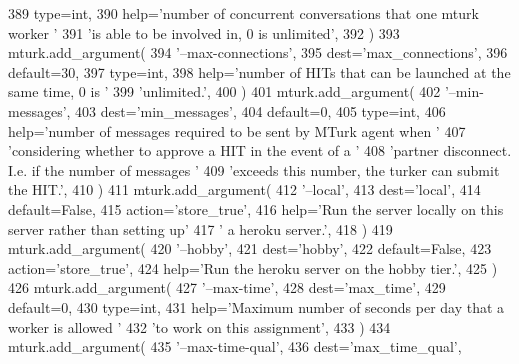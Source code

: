 \begin{DoxyCode}
389             type=int,
390             help=\textcolor{stringliteral}{'number of concurrent conversations that one mturk worker '}
391             \textcolor{stringliteral}{'is able to be involved in, 0 is unlimited'},
392         )
393         mturk.add\_argument(
394             \textcolor{stringliteral}{'--max-connections'},
395             dest=\textcolor{stringliteral}{'max\_connections'},
396             default=30,
397             type=int,
398             help=\textcolor{stringliteral}{'number of HITs that can be launched at the same time, 0 is '}
399             \textcolor{stringliteral}{'unlimited.'},
400         )
401         mturk.add\_argument(
402             \textcolor{stringliteral}{'--min-messages'},
403             dest=\textcolor{stringliteral}{'min\_messages'},
404             default=0,
405             type=int,
406             help=\textcolor{stringliteral}{'number of messages required to be sent by MTurk agent when '}
407             \textcolor{stringliteral}{'considering whether to approve a HIT in the event of a '}
408             \textcolor{stringliteral}{'partner disconnect. I.e. if the number of messages '}
409             \textcolor{stringliteral}{'exceeds this number, the turker can submit the HIT.'},
410         )
411         mturk.add\_argument(
412             \textcolor{stringliteral}{'--local'},
413             dest=\textcolor{stringliteral}{'local'},
414             default=\textcolor{keyword}{False},
415             action=\textcolor{stringliteral}{'store\_true'},
416             help=\textcolor{stringliteral}{'Run the server locally on this server rather than setting up'}
417             \textcolor{stringliteral}{' a heroku server.'},
418         )
419         mturk.add\_argument(
420             \textcolor{stringliteral}{'--hobby'},
421             dest=\textcolor{stringliteral}{'hobby'},
422             default=\textcolor{keyword}{False},
423             action=\textcolor{stringliteral}{'store\_true'},
424             help=\textcolor{stringliteral}{'Run the heroku server on the hobby tier.'},
425         )
426         mturk.add\_argument(
427             \textcolor{stringliteral}{'--max-time'},
428             dest=\textcolor{stringliteral}{'max\_time'},
429             default=0,
430             type=int,
431             help=\textcolor{stringliteral}{'Maximum number of seconds per day that a worker is allowed '}
432             \textcolor{stringliteral}{'to work on this assignment'},
433         )
434         mturk.add\_argument(
435             \textcolor{stringliteral}{'--max-time-qual'},
436             dest=\textcolor{stringliteral}{'max\_time\_qual'},

\end{DoxyCode}
